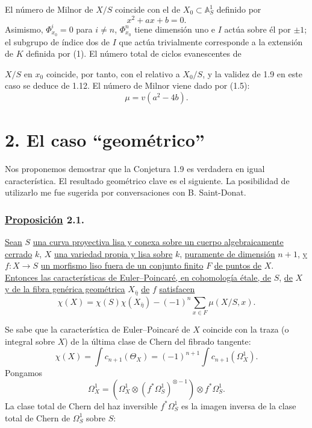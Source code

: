 El número de Milnor de $X/S$ coincide con el de
$X_0\subset\mathbb A_S^1$ definido por
\begin{equation}\tag{1}
x^2+a x+b=0.
\end{equation}
Asimismo, $\Phi^i_{x_0}=0$ para $i\ne n$, $\Phi^n_{x_0}$ tiene
dimensión uno e $I$ actúa sobre él por $\pm1$; el subgrupo de índice
dos de $I$ que actúa trivialmente corresponde a la extensión de $K$
definida por (1). El número total de ciclos evanescentes de

\pageoriginale

$X/S$ en $x_0$ coincide, por tanto, con el relativo a $X_0/S$, y la
validez de 1.9 en este caso se deduce de 1.12. El número de Milnor
viene dado por (1.5):
\begin{equation}\tag{1.13.1}
\mu=v(a^2-4b).
\end{equation}

\section*{2. El caso ``geométrico''}

Nos proponemos demostrar que la Conjetura 1.9 es verdadera en igual
característica. El resultado geométrico clave es el siguiente. La
posibilidad de utilizarlo me fue sugerida por conversaciones con
B. Saint-Donat.

\subsubsection*{\underline{Proposición} 2.1.}
\underline{Sean} $S$ \underline{una curva proyectiva lisa y conexa sobre un cuerpo
algebraicamente cerrado} $k$, $X$ \underline{una variedad propia y lisa sobre}
$k$, \underline{puramente de dimensión} $n+1$, \underline{y} $f:X\to S$ \underline{un morfismo liso
fuera de un conjunto finito} $F$ \underline{de puntos de} $X$. \underline{Entonces las
características de Euler--Poincaré, en cohomología étale, de} $S$, \underline{de}
$X$ \underline{y de la fibra genérica geométrica} $X_{\bar\eta}$ \underline{de} $f$
\underline{satisfacen}
\begin{equation}\tag{2.1.1}
\chi(X)=\chi(S)\chi(X_{\bar\eta})
-(-1)^n\sum_{x\in F}\mu(X/S,x).
\end{equation}

Se sabe que la característica de Euler--Poincaré de $X$ coincide con
la traza (o integral sobre $X$) de la última clase de Chern del fibrado
tangente:
\[
\chi(X)=\int c_{n+1}(\Theta_X)
=(-1)^{n+1}\int c_{n+1}(\Omega_X^1).
\]
Pongamos
\[
\Omega_X^1=\left(\Omega_X^1\otimes
(f^*\Omega_S^1)^{\otimes-1}\right)\otimes f^*\Omega_S^1.
\]
La clase total de Chern del haz inversible $f^*\Omega_S^1$ es la
imagen inversa de la clase total de Chern de $\Omega_S^1$ sobre $S$:

